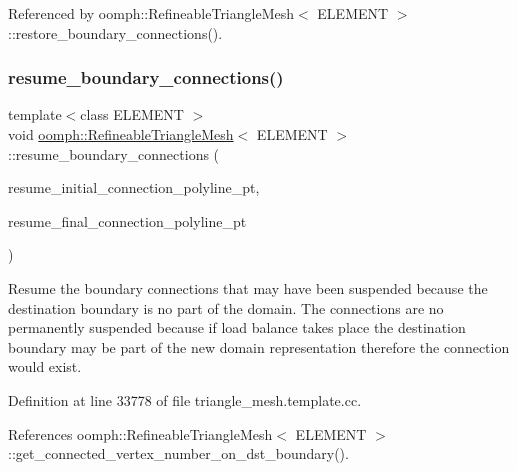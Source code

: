 Referenced by oomph\+::\+Refineable\+Triangle\+Mesh$<$ E\+L\+E\+M\+E\+N\+T $>$\+::restore\+\_\+boundary\+\_\+connections().

\mbox{\label{classoomph_1_1RefineableTriangleMesh_a418d6f148c3c62a0e714831dd0d73acf}} 
\subsubsection{\texorpdfstring{resume\+\_\+boundary\+\_\+connections()}{resume\_boundary\_connections()}}
{\footnotesize\ttfamily template$<$class E\+L\+E\+M\+E\+NT $>$ \\
void \hyperlink{classoomph_1_1RefineableTriangleMesh}{oomph\+::\+Refineable\+Triangle\+Mesh}$<$ E\+L\+E\+M\+E\+NT $>$\+::resume\+\_\+boundary\+\_\+connections (\begin{DoxyParamCaption}\item[{Vector$<$ Triangle\+Mesh\+Poly\+Line $\ast$$>$ \&}]{resume\+\_\+initial\+\_\+connection\+\_\+polyline\+\_\+pt,  }\item[{Vector$<$ Triangle\+Mesh\+Poly\+Line $\ast$$>$ \&}]{resume\+\_\+final\+\_\+connection\+\_\+polyline\+\_\+pt }\end{DoxyParamCaption})\hspace{0.3cm}{\ttfamily [protected]}}



Resume the boundary connections that may have been suspended because the destination boundary is no part of the domain. The connections are no permanently suspended because if load balance takes place the destination boundary may be part of the new domain representation therefore the connection would exist. 



Definition at line 33778 of file triangle\+\_\+mesh.\+template.\+cc.



References oomph\+::\+Refineable\+Triangle\+Mesh$<$ E\+L\+E\+M\+E\+N\+T $>$\+::get\+\_\+connected\+\_\+vertex\+\_\+number\+\_\+on\+\_\+dst\+\_\+boundary().

\mbox{\label{classoomph_1_1RefineableTriangleMesh_a2c0b3b2f5bf635ea8b3cba6554cc96b3}} 
